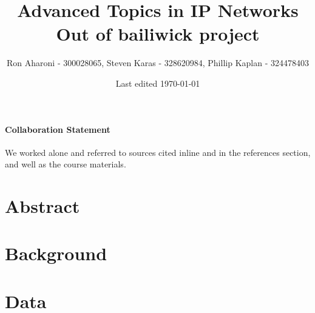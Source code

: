 \documentclass{idc_msc}
\title{Advanced Topics in IP Networks \\\large Out of bailiwick project}
\date{Last edited \today}
\author{Ron Aharoni\texorpdfstring{ - 300028065}{}, Steven Karas\texorpdfstring{ - 328620984}{}, Phillip Kaplan\texorpdfstring{ - 324478403}{}}
\begin{document}
\paragraph{Collaboration Statement}
  We worked alone and referred to sources cited inline and in the references section, and well as the course materials.


\section{Abstract}

\section{Background}


\section{Data}
\end{document}
